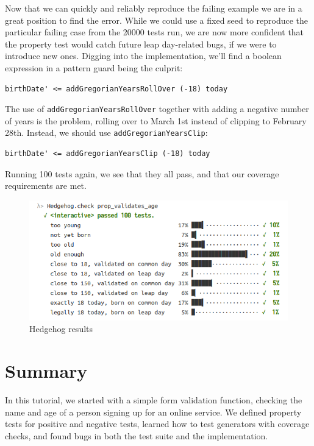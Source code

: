 Now that we can quickly and reliably reproduce the failing example we
are in a great position to find the error. While we could use a fixed
seed to reproduce the particular failing case from the 20000 tests run,
we are now more confident that the property test would catch future leap
day-related bugs, if we were to introduce new ones. Digging into the
implementation, we'll find a boolean expression in a pattern guard being
the culprit:

\begin{verbatim}
birthDate' <= addGregorianYearsRollOver (-18) today
\end{verbatim}
The use of \texttt{addGregorianYearsRollOver} together with adding a
negative number of years is the problem, rolling over to March 1st
instead of clipping to February 28th. Instead, we should use
\texttt{addGregorianYearsClip}:

\begin{verbatim}
birthDate' <= addGregorianYearsClip (-18) today
\end{verbatim}
Running 100 tests again, we see that they all pass, and that our
coverage requirements are met.

\begin{figure}[htbp]
 \centering
 \includegraphics[width=\linewidth]{./pics/hedgehog7.png}
 \caption{Hedgehog results}
 \label{fig:hedgehog7}
\end{figure}

\section{Summary}
\label{summary}

In this tutorial, we started with a simple form validation function,
checking the name and age of a person signing up for an online service.
We defined property tests for positive and negative tests, learned how
to test generators with coverage checks, and found bugs in both the test
suite and the implementation.

